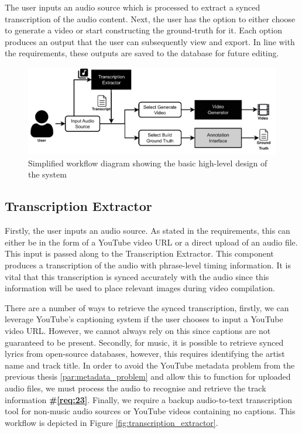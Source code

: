 \documentclass{l4proj}
\begin{document}
The user inputs an audio source which is processed to extract a synced transcription of the audio content. Next, the user has the option to either choose to generate a video or start constructing the ground-truth for it. Each option produces an output that the user can subsequently view and export. In line with the requirements, these outputs are saved to the database for future editing.

\begin{figure}[h]
    \centering
    \includegraphics[width=1\textwidth]{figures/simplified_architecture.pdf}
    \caption{Simplified workflow diagram showing the basic high-level design of the system}
    \label{fig:simplified_workflow}
\end{figure}

\subsection{Transcription Extractor}
Firstly, the user inputs an audio source. As stated in the requirements, this can either be in the form of a YouTube video URL or a direct upload of an audio file. This input is passed along to the Transcription Extractor. This component produces a transcription of the audio with phrase-level timing information. It is vital that this transcription is synced accurately with the audio since this information will be used to place relevant images during video compilation.

There are a number of ways to retrieve the synced transcription, firstly, we can leverage YouTube's captioning system if the user chooses to input a YouTube video URL. However, we cannot always rely on this since captions are not guaranteed to be present. Secondly, for music, it is possible to retrieve synced lyrics from open-source databases, however, this requires identifying the artist name and track title. In order to avoid the YouTube metadata problem from the previous thesis \ref{par:metadata_problem} and allow this to function for uploaded audio files, we must process the audio to recognise and retrieve the track information \textbf{\#\ref{req:23}}. Finally, we require a backup audio-to-text transcription tool for non-music audio sources or YouTube videos containing no captions. This workflow is depicted in Figure \ref{fig:transcription_extractor}.
\end{document}
